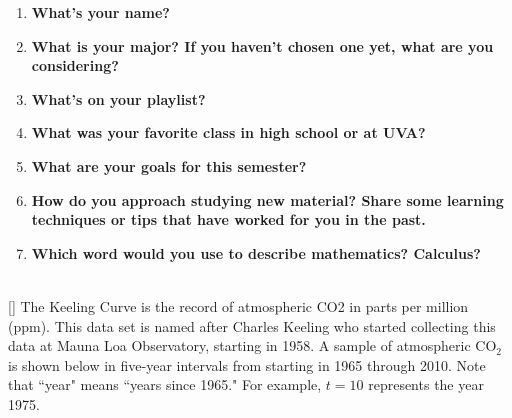 \documentclass[10pt]{article}
\begin{document}
    
\begin{enumerate}[label=\textbf{Q\arabic*.}]
    \item \textbf{What's your name?}
    
    \vspace{1.5cm} %
    
    \item \textbf{What is your major? If you haven't chosen one yet, what are you considering?}
    
    \vspace{2.5cm}
    
    \item \textbf{What's on your playlist?}
    
    \vspace{2.5cm}
    
    \item \textbf{What was your favorite class in high school or at UVA?}
    
    \vspace{2.5cm}
    
    
    \item \textbf{What are your goals for this semester?}
    
    \vspace{2.5cm}
    
    \item \textbf{How do you approach studying new material? Share some learning techniques or tips that have worked for you in the past.}

    \vspace{2.5cm}

    \item \textbf{Which word would you use to describe mathematics? Calculus?}
    
\end{enumerate}





\newpage
{} \\
[]{
The Keeling Curve is the record of atmospheric CO2 in parts per million (ppm). This data set is named after Charles Keeling who started collecting this data at Mauna Loa Observatory, starting in 1958.  A sample of atmospheric CO$_2$ is shown below in five-year intervals from starting in 1965 through 2010.  Note that ``year" means ``years since 1965."  For example, $t=10$ represents the year 1975.
}{
}
\end{document}
